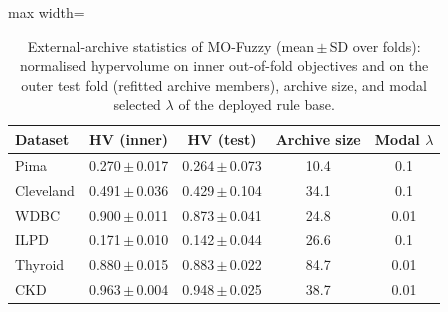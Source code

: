\begin{table}[t]
\centering
\scriptsize
\setlength{\tabcolsep}{4pt}
\caption{External-archive statistics of MO-Fuzzy (mean\,$\pm$\,SD over folds): normalised hypervolume on inner out-of-fold objectives and on the outer test fold (refitted archive members), archive size, and modal selected $\lambda$ of the deployed rule base.}
\label{tab:pareto}
\begin{adjustbox}{max width=\linewidth}
\begin{tabular}{lcccc}
\toprule
Dataset & HV (inner) & HV (test) & Archive size & Modal $\lambda$ \\
\midrule
Pima & 0.270\,$\pm$\,0.017 & 0.264\,$\pm$\,0.073 & 10.4 & 0.1 \\
Cleveland & 0.491\,$\pm$\,0.036 & 0.429\,$\pm$\,0.104 & 34.1 & 0.1 \\
WDBC & 0.900\,$\pm$\,0.011 & 0.873\,$\pm$\,0.041 & 24.8 & 0.01 \\
ILPD & 0.171\,$\pm$\,0.010 & 0.142\,$\pm$\,0.044 & 26.6 & 0.1 \\
Thyroid & 0.880\,$\pm$\,0.015 & 0.883\,$\pm$\,0.022 & 84.7 & 0.01 \\
CKD & 0.963\,$\pm$\,0.004 & 0.948\,$\pm$\,0.025 & 38.7 & 0.01 \\
\bottomrule
\end{tabular}
\end{adjustbox}
\end{table}
